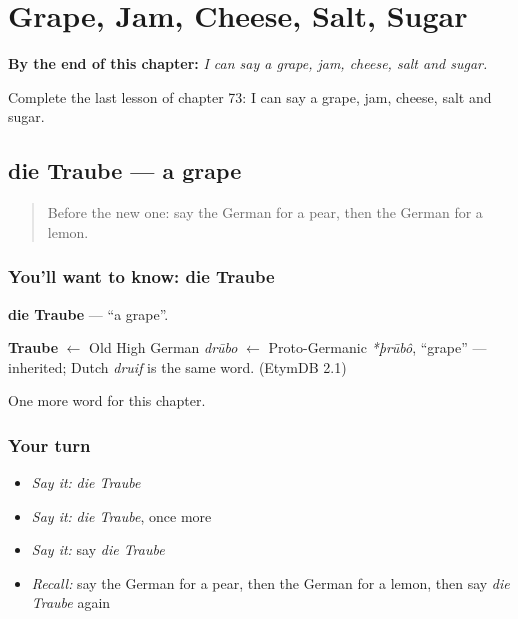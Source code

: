 
\chapter{Grape, Jam, Cheese, Salt, Sugar}
\label{ch:ge-grape-jam-cheese-salt-sugar}

\begin{chapteropening}
\textbf{By the end of this chapter:} \emph{I can say a grape, jam, cheese, salt and sugar.}

Complete the last lesson of chapter 73: I can say a grape, jam, cheese, salt and sugar.
\end{chapteropening}

\section[die Traube]{die Traube — a grape}

\label{lesson:GE-C73-traube}



\begin{quote}
Before the new one: say the German for a pear, then the German for a lemon.
\end{quote}

\subsection*{You'll want to know: die Traube}
\textbf{die Traube} — \textquotedblleft{}a grape\textquotedblright{}.

\begin{cousinweb}
\textbf{Traube} $\leftarrow$ Old High German \emph{drūbo} $\leftarrow$ Proto-Germanic \emph{*þrūbô}, \textquotedblleft{}grape\textquotedblright{} — inherited; Dutch \emph{druif} is the same word. (EtymDB 2.1)
\end{cousinweb}

\begin{grammarlens}[title={What you've built}]
One more word for this chapter.
\end{grammarlens}

\subsection*{Your turn}
\begin{itemize}
\raggedright
  \item \emph{Say it:} \emph{die Traube}
  \item \emph{Say it:} \emph{die Traube}, once more
  \item \emph{Say it:} say \emph{die Traube}
  \item \emph{Recall:} say the German for a pear, then the German for a lemon, then say \emph{die Traube} again
\end{itemize}

